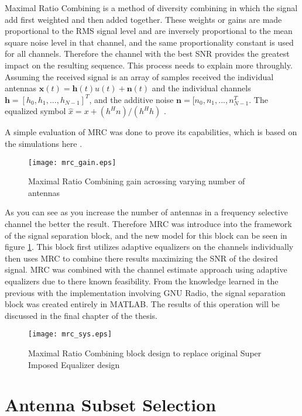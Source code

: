 Maximal Ratio Combining is a method of diversity combining in which the signal add first weighted and then added together.  These weights or gains are made proportional to the RMS signal level and are inversely proportional to the mean square noise level in that channel, and the same proportionality constant is used for all channels\cite{fs1037c}.  Therefore the channel with the best SNR provides the greatest impact on the resulting sequence.  This process needs to explain more throughly.  Assuming the received signal is an array of samples received the individual antennas \(\boldsymbol{x}(t)=\boldsymbol{h}(t)u(t)+\boldsymbol{n}(t)\) and the individual channels \(\boldsymbol{h}=[h_{0},h_{1},...,h_{N-1}]^{T}\), and the additive noise \(\boldsymbol{n}=[n_{0},n_{1},...,n_{N-1}^{T}\).  The equalized symbol \(\hat{x}=x+(h^{H}n)/(h^{H}h) \) \cite{diversity}.

A simple evaluation of MRC was done to prove its capabilities, which is based on the simulations here \cite{mrc_m}.

\begin{figure}[!ht] 
\centering
\texttt{[image: mrc\_gain.eps]}
\caption{Maximal Ratio Combining gain acrossing varying number of antennas}
\end{figure}

As you can see as you increase the number of antennas in a frequency selective channel the better the result.  Therefore MRC was introduce into the framework of the signal separation block, and the new model for this block can be seen in figure \ref{mrc_sys}.  This block first utilizes adaptive equalizers on the channels individually then uses MRC to combine there results maximizing the SNR of the desired signal.  MRC was combined with the channel estimate approach using adaptive equalizers due to there known feasibility.  From the knowledge learned in the previous with the implementation involving GNU Radio, the signal separation block was created entirely in MATLAB.  The results of this operation will be discussed in the final chapter of the thesis.\\

\begin{figure}[!ht]\label{mrc_sys}
\centering
\texttt{[image: mrc\_sys.eps]}
\caption{Maximal Ratio Combining block design to replace original Super Imposed Equalizer design}
\end{figure}

\section{Antenna Subset Selection}

